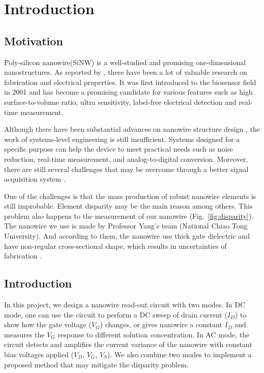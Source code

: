 \chapter{Introduction}
\section{Motivation}
Poly-silicon nanowire(SiNW) is a well-studied and promising one-dimensional nanostructures.
As reported by \cite{C25th}, there have been a lot of valuable research on fabrication and electrical properties.
It was first introduced to the biosensor field in 2001\cite{C2001} and has become a promising candidate for various features such as high surface-to-volume ratio, ultra sensitivity, label-free electrical detection and real-time measurement.

Although there have been substantial advances on nanowire structure design \cite{R1}, the work of systems-level engineering is still insufficient.
Systems designed for a specific purpose can help the device to meet practical needs such as noise reduction, real-time measurement, and analog-to-digital conversion.
Moreover, there are still several challenges that may be overcome through a better signal acquisition system \cite{R1}.

One of the challenges is that the mass production of robust nanowire elements is still improbable.
Element disparity may be the main reason among others.
This problem also happens to the measurement of our nanowire (Fig.~\ref{fig:disparity}).
The nanowire we use is made by Professor Yang's team (National Chiao Tong University).
And according to them, the nanowire use thick gate dielectric and have non-regular cross-sectional shape, which results in uncertainties of fabrication \cite{C6}.


\section{Introduction}
In this project, we design a nanowire read-out circuit with two modes.
In DC mode, one can use the circuit to perform a DC sweep of drain current ($I_D$) to show how the gate voltage ($V_{G}$) changes, or gives nanowire a constant $I_D$ and measures the $V_{G}$ response to different solution concentration.
In AC mode, the circuit detects and amplifies the current variance of the nanowire with constant bias voltages applied ($V_D$, $V_G$, $V_S$).
We also combine two modes to implement a proposed method that may mitigate the disparity problem.

